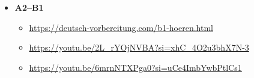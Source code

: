 \documentclass[a4paper]{article}
\title{}
\date{}
\author{Mohammad Rahmani}
\begin{document}
   \maketitle


   \begin{itemize}
      \item \textbf{A2--B1}
      \begin{itemize}
         \item \href{https://deutsch-vorbereitung.com/b1-hoeren.html}{https://deutsch-vorbereitung.com/b1-hoeren.html}
         \item \href{https://youtu.be/2L_rYOjNVBA?si=xhC_4O2u3bhX7N-3}{https://youtu.be/2L\_rYOjNVBA?si=xhC\_4O2u3bhX7N-3}
         \item \href{https://youtu.be/6mrnNTXPga0?si=uCe4ImbYwbPtlCs1}{https://youtu.be/6mrnNTXPga0?si=uCe4ImbYwbPtlCs1}
      \end{itemize}
   \end{itemize}


   
   
\end{document}
